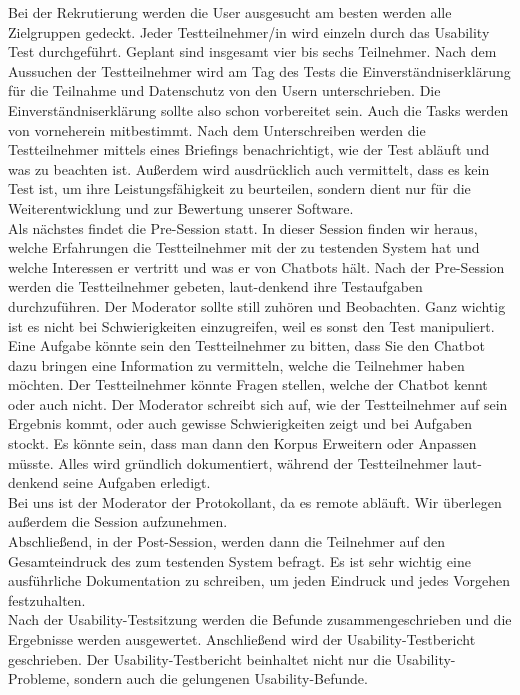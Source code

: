 \noindent Bei der Rekrutierung werden die User ausgesucht am besten werden alle Zielgruppen gedeckt. Jeder Testteilnehmer/in wird einzeln durch das Usability Test durchgeführt. 
Geplant sind insgesamt vier bis sechs Teilnehmer. Nach dem Aussuchen der Testteilnehmer wird am Tag des Tests die Einverständniserklärung für die Teilnahme und Datenschutz von den Usern unterschrieben. 
Die Einverständniserklärung sollte also schon vorbereitet sein. Auch die Tasks werden von vorneherein mitbestimmt. Nach dem Unterschreiben werden die Testteilnehmer mittels eines Briefings benachrichtigt, wie der Test abläuft und was zu beachten ist. 
Außerdem wird ausdrücklich auch vermittelt, dass es kein Test ist, um ihre Leistungsfähigkeit zu beurteilen, sondern dient nur für die Weiterentwicklung und zur Bewertung unserer Software.
\\

\noindent Als nächstes findet die Pre-Session statt. In dieser Session finden wir heraus, welche Erfahrungen die Testteilnehmer mit der zu testenden System hat und welche Interessen er vertritt und was er von Chatbots hält. 
Nach der Pre-Session werden die Testteilnehmer gebeten, laut-denkend ihre Testaufgaben durchzuführen. 
Der Moderator sollte still zuhören und Beobachten. Ganz wichtig ist es nicht bei Schwierigkeiten einzugreifen, weil es sonst den Test manipuliert.
\\

\noindent Eine Aufgabe könnte sein den Testteilnehmer zu bitten, dass Sie den Chatbot dazu bringen eine Information zu vermitteln, welche die Teilnehmer haben möchten. 
Der Testteilnehmer könnte Fragen stellen, welche der Chatbot kennt oder auch nicht. 
Der Moderator schreibt sich auf, wie der Testteilnehmer auf sein Ergebnis kommt, oder auch gewisse Schwierigkeiten zeigt und bei Aufgaben stockt. 
Es könnte sein, dass man dann den Korpus Erweitern oder Anpassen müsste. 
Alles wird gründlich dokumentiert, während der Testteilnehmer laut-denkend seine Aufgaben erledigt.
\\

\noindent Bei uns ist der Moderator der Protokollant, da es remote abläuft. Wir überlegen außerdem die Session aufzunehmen. 
\\

\noindent Abschließend, in der Post-Session, werden dann die Teilnehmer auf den Gesamteindruck des zum testenden System befragt. 
Es ist sehr wichtig eine ausführliche Dokumentation zu schreiben, um jeden Eindruck und jedes Vorgehen festzuhalten.
\\

\noindent Nach der Usability-Testsitzung werden die Befunde zusammengeschrieben und die Ergebnisse werden ausgewertet. 
Anschließend wird der Usability-Testbericht geschrieben. 
Der Usability-Testbericht beinhaltet nicht nur die Usability-Probleme, sondern auch die gelungenen Usability-Befunde.
